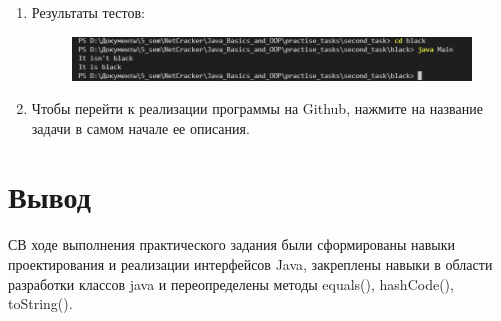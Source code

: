 \documentclass[a4paper]{article}
\begin{document}
\begin{enumerate}
        \item Результаты тестов:
        
        \begin{figure}[h!]
            \begin{center}
                \includegraphics[scale = 0.6]{test_t4.png}
                \label{p2} %
            \end{center}
        \end{figure}

        \item Чтобы перейти к реализации программы на Github, нажмите на название задачи в самом начале ее описания.
        
    \end{enumerate}

    \section{Вывод}
    СВ ходе выполнения практического задания были сформированы навыки проектирования и реализации интерфейсов Java, закреплены навыки в области разработки классов java и переопределены методы equals(), hashCode(), toString().
\end{document}
